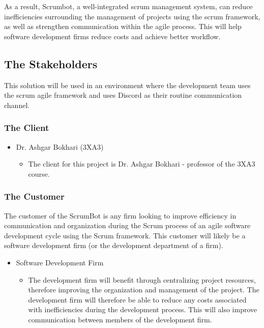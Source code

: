 \documentclass[12pt, titlepage]{article}
\begin{document}
As a result, Scrumbot, a well-integrated scrum management system, can reduce inefficiencies surrounding the management of projects using the scrum framework, as well as strengthen communication within the agile process. This will help software development firms reduce costs and achieve better workflow.

\subsection{The Stakeholders}
This solution will be used in an environment where the development team uses the scrum agile framework and uses Discord as their routine communication channel.
\subsubsection{The Client}
\begin{itemize}
    \item Dr. Ashgar Bokhari (3XA3)
    \begin{itemize}
      \item[] The client for this project is Dr. Ashgar Bokhari - professor of the 3XA3 course.
    \end{itemize}
\end{itemize}
\subsubsection{The Customer}
The customer of the ScrumBot is any firm looking to improve efficiency in communication and organization during the Scrum process of an agile software development cycle using the Scrum framework. This customer will likely be a software development firm (or the development department of a firm).
\begin{itemize}
    \item Software Development Firm
    \begin{itemize}
      \item[] The development firm will benefit through centralizing project resources, therefore improving the organization and management of the project. The development firm will therefore be able to reduce any costs associated with inefficiencies during the development process. This will also improve communication between members of the development firm.
    \end{itemize}
\end{itemize}
\end{document}

